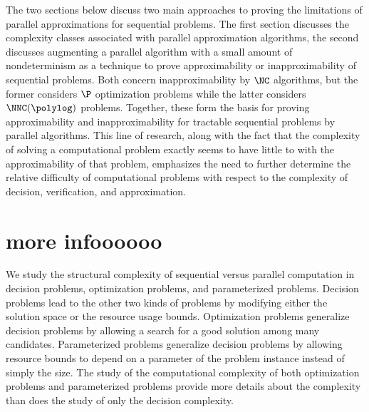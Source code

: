 %
The two sections below discuss two main approaches to proving the limitations of parallel approximations for sequential problems.
The first section discusses the complexity classes associated with parallel approximation algorithms, the second discusses augmenting a parallel algorithm with a small amount of nondeterminism as a technique to prove approximability or inapproximability of sequential problems.
Both concern inapproximability by $\NC$ algorithms, but the former considers $\P$ optimization problems while the latter considers $\NNC(\polylog)$ problems.
Together, these form the basis for proving approximability and inapproximability for tractable sequential problems by parallel algorithms.
This line of research, along with the fact that the complexity of solving a computational problem exactly seems to have little to with the approximability of that problem, emphasizes the need to further determine the relative difficulty of computational problems with respect to the complexity of decision, verification, and approximation.

\section{more infoooooo}

We study the structural complexity of sequential versus parallel computation in decision problems, optimization problems, and parameterized problems.
Decision problems lead to the other two kinds of problems by modifying either the solution space or the resource usage bounds.
Optimization problems generalize decision problems by allowing a search for a good solution among many candidates.
Parameterized problems generalize decision problems by allowing resource bounds to depend on a parameter of the problem instance instead of simply the size.
The study of the computational complexity of both optimization problems and parameterized problems provide more details about the complexity than does the study of only the decision complexity.

\begin{minipage}[t]{0.31\linewidth}
  \centering
  
\end{minipage}%
\begin{minipage}[t]{0.31\linewidth}
  \centering
  
\end{minipage}%
\begin{minipage}[t]{0.31\linewidth}
  \centering
  
\end{minipage}

